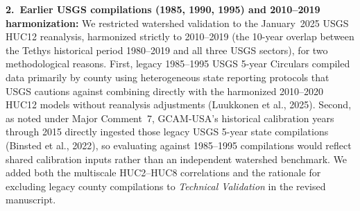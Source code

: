 \documentclass[11pt,letterpaper]{article}
\begin{document}
{\textbf{2.~Earlier USGS compilations (1985, 1990, 1995) and 2010--2019 harmonization:}
We restricted watershed validation to the January~2025 USGS HUC12 reanalysis, harmonized strictly to 2010--2019 (the 10-year overlap between the Tethys historical period 1980--2019 and all three USGS sectors), for two methodological reasons. First, legacy 1985--1995 USGS 5-year Circulars compiled data primarily by county using heterogeneous state reporting protocols that USGS cautions against combining directly with the harmonized 2010--2020 HUC12 models without reanalysis adjustments (Luukkonen et al., 2025). Second, as noted under Major Comment~7, GCAM-USA's historical calibration years through 2015 directly ingested those legacy USGS 5-year state compilations (Binsted et al., 2022), so evaluating against 1985--1995 compilations would reflect shared calibration inputs rather than an independent watershed benchmark. We added both the multiscale HUC2--HUC8 correlations and the rationale for excluding legacy county compilations to \textit{Technical Validation} in the revised manuscript.}
\end{document}

